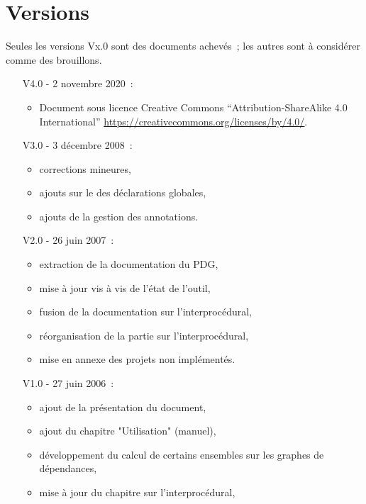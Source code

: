 \section*{Versions}

\begin{small}
Seules les versions Vx.0 sont des documents achevés~;
les autres sont à considérer comme des brouillons.

\begin{enumerate}
  \item[V4.0 -] 2 novembre 2020~:
    \begin{itemize}
    \item Document sous licence Creative Commons
      ``Attribution-ShareAlike 4.0 International''
      \url{https://creativecommons.org/licenses/by/4.0/}.
    \end{itemize}
  \item[V3.0 - ] 3 décembre 2008~:
    \begin{itemize}
      \item corrections mineures,
      \item ajouts sur le \slicing des déclarations globales,
      \item ajouts de la gestion des annotations.
    \end{itemize}
  \item[V2.0 - ] 26 juin 2007~:
    \begin{itemize}
      \item extraction de la documentation du PDG,
      \item mise à jour vis à vis de l'état de l'outil,
      \item fusion de la documentation sur l'interprocédural,
      \item réorganisation de la partie sur l'interprocédural,
      \item mise en annexe des projets non implémentés.
    \end{itemize}
  \item[V1.0 - ] 27 juin 2006~:
    \begin{itemize}
      \item ajout de la présentation du document,
      \item ajout du chapitre "Utilisation" (manuel),
      \item développement du calcul de certains ensembles sur les graphes de
            dépendances,
      \item mise à jour du chapitre sur l'interprocédural,

\end{itemize}
\end{enumerate}
\end{small}

